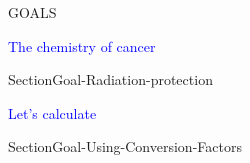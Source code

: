 \documentclass[main.tex]{subfiles}
\begin{document}
\begin{marginfigure}
\begin{mytcbox}{GOALS}
\begin{center}\textcolor{blue}{\faFlash The chemistry of cancer} \end{center}
\begin{enumerate}[label=\protect\circled{\color{white}\arabic*}]
{SectionGoal-Radiation-protection}
	\end{enumerate}
	
\begin{center}\textcolor{blue}{\faFlash Let's calculate} \end{center}
\begin{enumerate}[label=\protect\circled{\color{white}\arabic*}]
{SectionGoal-Using-Conversion-Factors}
\end{enumerate}
			 				 




\end{mytcbox}
\vspace{1cm}
\end{marginfigure}%
\end{document}
